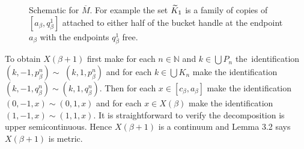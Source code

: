\documentclass[12pt]{article}
\theoremstyle{plain}
\theoremstyle{definition}
\newcommand{\B}{\ensuremath{\beta}}
\newcommand{\NN}{\ensuremath{\mathbb N}}
\newcommand{\0}{\ensuremath{\varnothing}}
\newcommand{\wt}{\ensuremath{\widetilde}}
\begin{document}
\begin{figure}[!h]
		\caption[width = 50cm]{Schematic for   $\overline M$. For example the set $\wt K_1$ is a family of copies of $[a_\B,q^1_\B]$ attached to either half of the bucket handle at the endpoint $a_\B$ with the endpoints $q^1_\B$ free.
		}
	\end{figure}
	
	
	
	
	
	To obtain $X(\B+1)$ first make for each $n \in \NN$ and $k \in \bigcup P_n$ \mbox{the identification} $(k,-1,p^n_\B) \sim $ $(k,1,p^n_\B)$
	and for each $k \in \bigcup K_n$ make the identification $(k,-1,q^n_\B) \sim (k,1,q^n_\B)$.
	Then for each $x \in [c_\B,a_\B]$ make the identification $(0,-1,x) \sim (0,1,x)$
	and for each $x \in X(\B)$ make the identification $(1,-1,x) \sim (1,1,x)$.
	It is straightforward to verify the decomposition is upper semicontinuous.
	Hence $X(\B+1)$ is a continuum and \cite{nadlerbook} Lemma 3.2 says $X(\B+1)$ is metric.
	
	
	
\end{document}
